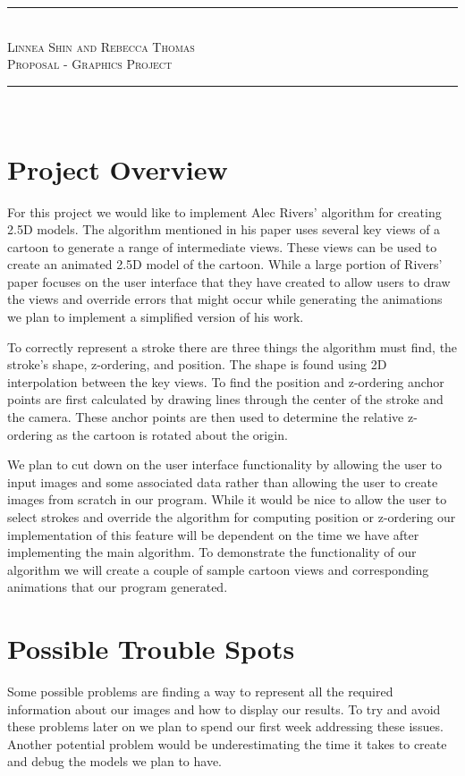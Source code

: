 \documentclass[12pt]{article}
\begin{document}
\newcommand{\HRule}{\rule{\linewidth}{0.4mm}}
\begin{center}
\HRule \\
\textsc{Linnea Shin and Rebecca Thomas }\\[.1cm]
\textsc{\Large{Proposal - Graphics Project}}\\[-.1cm] %
\HRule \\[.4cm]
\end{center}
\doublespacing
\section*{Project Overview}
For this project we would like to implement Alec Rivers' algorithm for creating 2.5D models. The algorithm mentioned in his paper uses several key views of a cartoon to generate a range of intermediate views. These views can be used to create an animated 2.5D model of the cartoon.  While a large portion of Rivers' paper focuses on the user interface that they have created to allow users to draw the views and override errors that might occur while generating the animations we plan to implement a simplified version of his work. 

To correctly represent a stroke there are three things the algorithm must find, the stroke's shape, z-ordering, and position. The shape is found using 2D interpolation between the key views. To find the position and z-ordering anchor points are first calculated by drawing lines through the center of the stroke and the camera. These anchor points are then used to determine the relative z-ordering as the cartoon is rotated about the origin.

We plan to cut down on the user interface functionality by allowing the user to input images and some associated data rather than allowing the user to create images from scratch in our program. While it would be nice to allow the user to select strokes and override the algorithm for computing position or z-ordering our implementation of this feature will be dependent on the time we have after implementing the main algorithm. To demonstrate the functionality of our algorithm we will create a couple of sample cartoon views and corresponding animations that our program generated.

\section*{Possible Trouble Spots}
Some possible problems are finding a way to represent all the required information about our images and how to display our results. To try and avoid these problems later on we plan to spend our first week addressing these issues. Another potential problem would be underestimating the time it takes to create and debug the models we plan to have.
\end{document}
